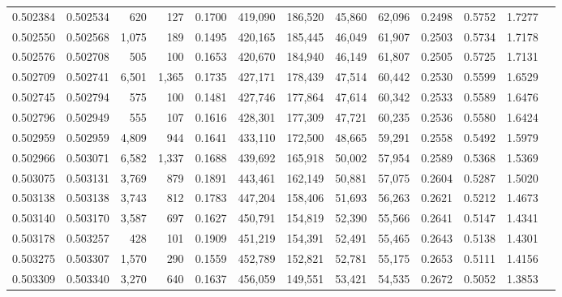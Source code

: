 \begin{tabular}{rrrrrrrrrrrrr}
0.502384 & 0.502534 &   620 &   127 &                                     0.1700 & 419,090 & 186,520 &  45,860 &  62,096 & 0.2498 & 0.5752 & 1.7277 \\
0.502550 & 0.502568 & 1,075 &   189 &                                     0.1495 & 420,165 & 185,445 &  46,049 &  61,907 & 0.2503 & 0.5734 & 1.7178 \\
0.502576 & 0.502708 &   505 &   100 &                                     0.1653 & 420,670 & 184,940 &  46,149 &  61,807 & 0.2505 & 0.5725 & 1.7131 \\
0.502709 & 0.502741 & 6,501 & 1,365 &                                     0.1735 & 427,171 & 178,439 &  47,514 &  60,442 & 0.2530 & 0.5599 & 1.6529 \\
0.502745 & 0.502794 &   575 &   100 &                                     0.1481 & 427,746 & 177,864 &  47,614 &  60,342 & 0.2533 & 0.5589 & 1.6476 \\
0.502796 & 0.502949 &   555 &   107 &                                     0.1616 & 428,301 & 177,309 &  47,721 &  60,235 & 0.2536 & 0.5580 & 1.6424 \\
0.502959 & 0.502959 & 4,809 &   944 &                                     0.1641 & 433,110 & 172,500 &  48,665 &  59,291 & 0.2558 & 0.5492 & 1.5979 \\
0.502966 & 0.503071 & 6,582 & 1,337 &                                     0.1688 & 439,692 & 165,918 &  50,002 &  57,954 & 0.2589 & 0.5368 & 1.5369 \\
0.503075 & 0.503131 & 3,769 &   879 &                                     0.1891 & 443,461 & 162,149 &  50,881 &  57,075 & 0.2604 & 0.5287 & 1.5020 \\
0.503138 & 0.503138 & 3,743 &   812 &                                     0.1783 & 447,204 & 158,406 &  51,693 &  56,263 & 0.2621 & 0.5212 & 1.4673 \\
0.503140 & 0.503170 & 3,587 &   697 &                                     0.1627 & 450,791 & 154,819 &  52,390 &  55,566 & 0.2641 & 0.5147 & 1.4341 \\
0.503178 & 0.503257 &   428 &   101 &                                     0.1909 & 451,219 & 154,391 &  52,491 &  55,465 & 0.2643 & 0.5138 & 1.4301 \\
0.503275 & 0.503307 & 1,570 &   290 &                                     0.1559 & 452,789 & 152,821 &  52,781 &  55,175 & 0.2653 & 0.5111 & 1.4156 \\
0.503309 & 0.503340 & 3,270 &   640 &                                     0.1637 & 456,059 & 149,551 &  53,421 &  54,535 & 0.2672 & 0.5052 & 1.3853 \\

\end{tabular}
